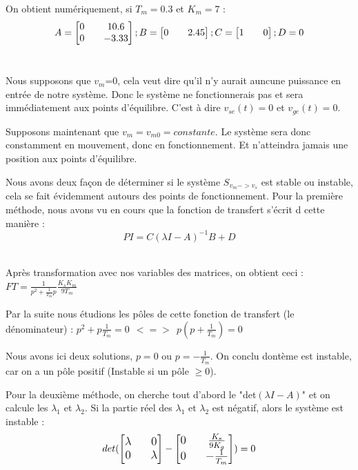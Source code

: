 \par On obtient numériquement, si $T_m=0.3$ et $K_m=7$ :
$$A=\begin{bmatrix}0&&10.6\\0&&-3.33\end{bmatrix} ; \normalsize B=\begin{bmatrix}0&&2.45\end{bmatrix} ; \normalsize C=\begin{bmatrix}1&&0\end{bmatrix} ; \normalsize D=0$$
~~\\

\par Nous supposons que $v_m$=0, cela veut dire qu'il n'y aurait auncune puissance en entrée de notre système. Donc le système ne fonctionnerais pas et sera immédiatement aux points d'équilibre. C'est à dire $v_{se}(t)=0$ et $v_{ge}(t)=0$.\\

\par Supposons maintenant que $v_m=v_{m0}=constante$. Le système sera donc constamment en mouvement, donc en fonctionnement. Et n'atteindra jamais une position aux points d'équilibre.\\

\par Nous avons deux façon de déterminer si le système $S_{v_m->v_s}$ est stable ou instable, cela se fait évidemment autours des points de fonctionnement. Pour la première méthode, nous avons vu en cours que la fonction de transfert s'écrit d cette manière : \large $$PI=C(\lambda I-A)^{-1}B+D$$ \normalsize \\

\par Après transformation avec nos variables des matrices, on obtient ceci : 
\large$FT=\frac{1}{p^2+\frac{1}{T_m}p}\frac{K_sK_m}{9T_m}$ \normalsize \\

\par Par la suite nous étudions les pôles de cette fonction de transfert (le dénominateur) :
\large$p^2+p\frac{1}{T_m}=0~~<=>~~p(p+\frac{1}{T_m})=0$ \normalsize \\

\par Nous avons ici deux solutions, $p=0$ ou $p=-\frac{1}{T_m}$. On conclu dontème est instable, car on a un pôle positif (Instable si un pôle $\ge0$).\\

\par Pour la deuxième méthode, on cherche tout d'abord le "det$(\lambda I-A)$" et on calcule les $\lambda_1$ et $
\lambda_2$. Si la partie réel des $\lambda_1$ et $\lambda_2$ est négatif, alors le système est instable :
$$det(\large\begin{bmatrix}\lambda && 0 \\ 0 && \lambda \end{bmatrix} - \begin{bmatrix}0 && \frac{K_s}{9K_g} \\ 0 && -\frac{1}{T_m}\end{bmatrix}\normalsize)=0$$ \\

